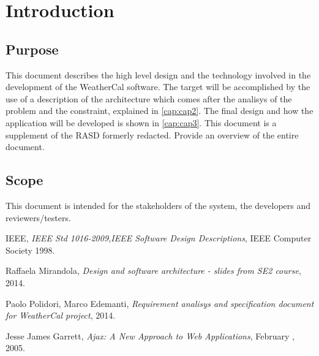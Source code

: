 \chapter{Introduction} \label{cap:cap1}

\section{Purpose}
This document describes the high level design and the technology involved in the development of the WeatherCal software. The target will be accomplished by the use of a description of the architecture which comes after the analisys of the problem and the constraint, explained in \autoref{cap:cap2}. The final design and how the application will be developed is shown in \autoref{cap:cap3}. This document is a supplement of the RASD formerly redacted.
Provide an overview of the entire document.

\section{Scope}
This document is intended for the stakeholders of the system, the developers and reviewers/testers.


\begin{thebibliography}{9}
IEEE,
\textit{IEEE Std 1016-2009,IEEE Software Design Descriptions},
IEEE Computer Society 1998.
 
Raffaela Mirandola,
\textit{Design and software architecture - slides from SE2 course},
2014.
 
Paolo Polidori, Marco Edemanti,
\textit{Requirement analisys and specification document for WeatherCal project},
2014.

Jesse James Garrett,
\textit{Ajax: A New Approach to Web Applications},
February , 2005.
\end{thebibliography}